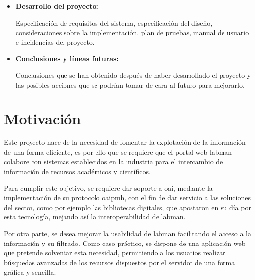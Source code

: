 \begin{itemize}
	\clearpage

	\item \textbf{Desarrollo del proyecto:}
	
	Especificación de requisitos del sistema, especificación del diseño, consideraciones sobre la implementación, plan de pruebas, manual de usuario e incidencias del proyecto.

	\item \textbf{Conclusiones y líneas futuras:}

	Conclusiones que se han obtenido después de haber desarrollado el proyecto y las posibles acciones que se podrían tomar de cara al futuro para mejorarlo.
\end{itemize}

\section{Motivación}

Este proyecto nace de la necesidad de fomentar la explotación de la información de una forma eficiente, es por ello que se requiere que el portal web \acrshort{labman} colabore con sistemas establecidos en la industria para el intercambio de información de recursos académicos y científicos.

Para cumplir este objetivo, se requiere dar soporte a \acrshort{oai}, mediante la implementación de su protocolo \acrshort{oaipmh}, con el fin de dar servicio a las soluciones del sector, como por ejemplo las bibliotecas digitales, que apostaron en su día por esta tecnología, mejando así la interoperabilidad de \acrshort{labman}.

Por otra parte, se desea mejorar la usabilidad de \acrshort{labman} facilitando el acceso a la información y su filtrado. Como caso práctico, se dispone de una aplicación web que pretende solventar esta necesidad, permitiendo a los usuarios realizar búsquedas avanzadas de los recursos dispuestos por el servidor de una forma gráfica y sencilla.





